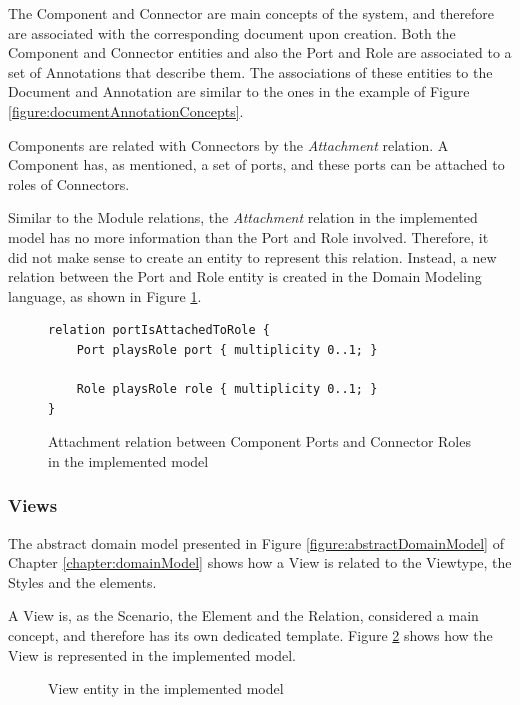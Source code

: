 \documentclass{llncs}
\begin{document}
The Component and Connector are main concepts of the system, and therefore are associated with the corresponding document upon creation. Both the Component and Connector entities and also the Port and Role are associated to a set of Annotations that describe them. The associations of these entities to the Document and Annotation are similar to the ones in the example of Figure \ref{figure:documentAnnotationConcepts}.

Components are related with Connectors by the \textit{Attachment} relation. A Component has, as mentioned, a set of ports, and these ports can be attached to roles of Connectors.

Similar to the Module relations, the \textit{Attachment} relation in the implemented model has no more information than the Port and Role involved. Therefore, it did not make sense to create an entity to represent this relation. Instead, a new relation between the Port and Role entity is created in the Domain Modeling language, as shown in Figure \ref{figure:modelAttachmentRelation}.

\begin{figure}
\lstset{style=customjava}
\begin{lstlisting}
relation portIsAttachedToRole {
	Port playsRole port { multiplicity 0..1; }
	
	Role playsRole role { multiplicity 0..1; }
}
\end{lstlisting}
\caption{Attachment relation between Component Ports and Connector Roles in the implemented model}
\label{figure:modelAttachmentRelation}
\end{figure}


\subsubsection{Views}
\label{subsection:modelViews}

The abstract domain model presented in Figure \ref{figure:abstractDomainModel} of Chapter \ref{chapter:domainModel} shows how a View is related to the Viewtype, the Styles and the elements. 

A View is, as the Scenario, the Element and the Relation, considered a main concept, and therefore has its own dedicated template. Figure \ref{figure:modelView} shows how the View is represented in the implemented model.

\begin{figure}
\centering
\renewcommand {\umltextcolor}{black}
\renewcommand {\umlfillcolor}{none}
\renewcommand {\umldrawcolor}{black}
\caption{View entity in the implemented model}
\label{figure:modelView}
\end{figure}
\end{document}
